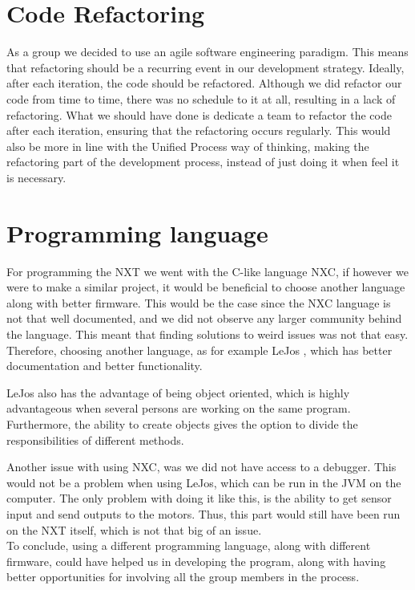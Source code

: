 \section{Code Refactoring}
As a group we decided to use an agile software engineering paradigm. This means
that refactoring should be a recurring event in our development strategy.
Ideally, after each iteration, the code should be refactored. Although we did
refactor our code from time to time, there was no schedule to it at all,
resulting in a lack of refactoring. What we should have done is dedicate a team
to refactor the code after each iteration, ensuring that the refactoring occurs
regularly. This would also be more in line with the Unified Process way of
thinking, making the refactoring part of the development process, instead of
just doing it when feel it is necessary.

\section{Programming language}
For programming the NXT we went with the C-like language NXC, if however we were
to make a similar project, it would be beneficial to choose another language
along with better firmware. This would be the case since the NXC language is not
that well documented, and we did not observe any larger community behind
the language. This meant that finding solutions to weird issues was not that
easy. Therefore, choosing another language, as for example LeJos \cite{LeJos},
which has better documentation and better functionality. \nl

LeJos also has the advantage of being object oriented, which is highly
advantageous when several persons are working on the same program. Furthermore,
the ability to create objects gives the option to divide the responsibilities of
different methods.\nl

Another issue with using NXC, was we did not have access to a debugger. This
would not be a problem when using LeJos, which can be run in the JVM on the
computer. The only problem with doing it like this, is the ability to get sensor
input and send outputs to the motors. Thus, this part would still have been run
on the NXT itself, which is not that big of an issue.\\
To conclude, using a different programming language, along with different
firmware, could have helped us in developing the program, along with having
better opportunities for involving all the group members in the process.


